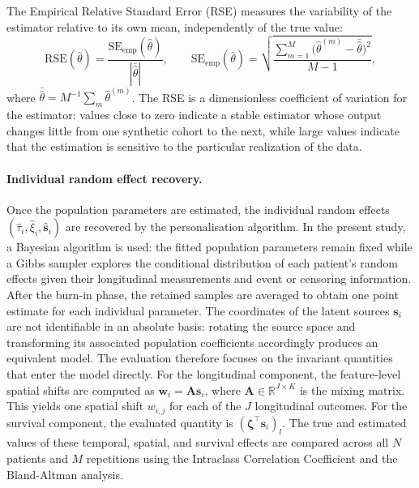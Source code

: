 \documentclass{rapportCS}
\begin{document}
The {Empirical Relative Standard Error} (RSE) measures the variability of the estimator relative to its own mean, independently of the true value:
\begin{equation}
  \mathrm{RSE}(\hat{\theta})
  = \frac{\mathrm{SE}_{\mathrm{emp}}(\hat{\theta})}{|\bar{\hat{\theta}}|},
  \qquad
  \mathrm{SE}_{\mathrm{emp}}(\hat{\theta})
  = \sqrt{\frac{\displaystyle\sum_{m=1}^{M}\bigl(\hat{\theta}^{(m)} - \bar{\hat{\theta}}\bigr)^2}{M - 1}},
\end{equation}
where $\bar{\hat{\theta}} = M^{-1}\sum_m \hat{\theta}^{(m)}$. The RSE is a dimensionless coefficient of variation for the estimator: values close to zero indicate a stable estimator whose output changes little from one synthetic cohort to the next, while large values indicate that the estimation is sensitive to the particular realization of the data.

\paragraph{Individual random effect recovery.} 
Once the population parameters are estimated, the individual random effects $(\hat{\tau}_i,\hat{\xi}_i,\hat{\mathbf{s}}_i)$ are recovered by the personalisation algorithm. In the present study, a Bayesian algorithm is used: the fitted population parameters remain fixed while a Gibbs sampler explores the conditional distribution of each patient's random effects given their longitudinal measurements and event or censoring information. After the burn-in phase, the retained samples are averaged to obtain one point estimate for each individual parameter. The coordinates of the latent sources $\mathbf{s}_i$ are not identifiable in an absolute basis: rotating the source space and transforming its associated population coefficients accordingly produces an equivalent model. The evaluation therefore focuses on the invariant quantities that enter the model directly. For the longitudinal component, the feature-level spatial shifts are computed as $\mathbf{w}_i=\mathbf{A}\mathbf{s}_i$, where $\mathbf{A}\in\mathbb{R}^{J\times K}$ is the mixing matrix. This yields one spatial shift $w_{i,j}$ for each of the $J$ longitudinal outcomes. For the survival component, the evaluated quantity is $(\boldsymbol{\zeta}^{\top}\mathbf{s}_i)_l$. The true and estimated values of these temporal, spatial, and survival effects are compared across all $N$ patients and $M$ repetitions using the {Intraclass Correlation Coefficient} and the {Bland-Altman analysis}.
\end{document}
